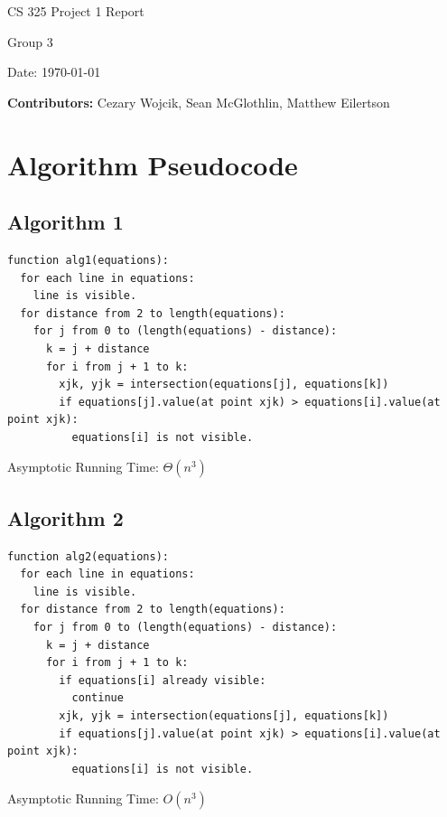 \documentclass[12pt,letterpaper]{article}
\begin{document}
\begin{titlepage}
    \vspace*{4cm}
    {\huge \center
        CS 325 Project 1 Report\\[1cm]
    }
    \center
    {\large 
        Group 3

        Date: \today 

    \textbf{Contributors:}
	Cezary Wojcik,
    Sean McGlothlin,
    Matthew Eilertson
	}

\end{titlepage}

\section{Algorithm Pseudocode}
\subsection{Algorithm 1}
\begin{verbatim}
function alg1(equations):
  for each line in equations:
    line is visible.
  for distance from 2 to length(equations):
    for j from 0 to (length(equations) - distance):
      k = j + distance
      for i from j + 1 to k:
        xjk, yjk = intersection(equations[j], equations[k])
        if equations[j].value(at point xjk) > equations[i].value(at point xjk):
          equations[i] is not visible.
\end{verbatim}

Asymptotic Running Time: $\Theta(n^3)$

\subsection{Algorithm 2}
\begin{verbatim}
function alg2(equations):
  for each line in equations:
    line is visible.
  for distance from 2 to length(equations):
    for j from 0 to (length(equations) - distance):
      k = j + distance
      for i from j + 1 to k:
        if equations[i] already visible:
          continue
        xjk, yjk = intersection(equations[j], equations[k])
        if equations[j].value(at point xjk) > equations[i].value(at point xjk):
          equations[i] is not visible.
\end{verbatim}

Asymptotic Running Time: $O(n^3)$

\newpage
\end{document}
